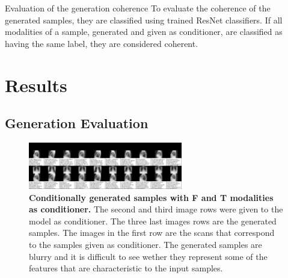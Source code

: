     \begin{frame}{Evaluation of the generation coherence}
        To evaluate the coherence of the generated samples, they are classified using trained ResNet classifiers.
        If all modalities of a sample, generated and given as conditioner, are classified as having the same label, they are considered coherent.
    \end{frame}


    \section{Results}

    \subsection{Generation Evaluation}
    \begin{frame}
        \begin{figure}
            \centering
            \includegraphics[width=0.6\textwidth, height = \textheight, keepaspectratio]{data/cond_gen/Lateral_text}
                \caption{\tiny{
        \textbf{Conditionally generated samples with F and T modalities as conditioner.} The second and third image rows were given to the model as conditioner. The three last images rows are the generated samples. The images in the first row are the scans that correspond to the samples given as conditioner. The generated samples are blurry and it is difficult to see wether they represent some of the features that are characteristic to the input samples.
    }}
        \end{figure}
    \end{frame}



    \printbibliography

